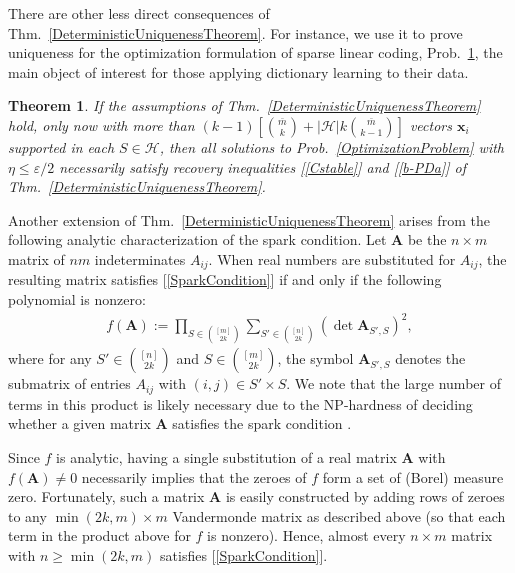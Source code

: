 \documentclass[9pt,twocolumn]{pnas-new}
\newtheorem{theorem}{Theorem}
\renewcommand{\eqref}[1]{\textnormal{[\ref{#1}]}}
\begin{document}
There are other less direct consequences of Thm.~\ref{DeterministicUniquenessTheorem}.  For instance, we use it to prove uniqueness for the optimization formulation of sparse linear coding, Prob.~\ref{SLCopt}, the main object of interest for those applying dictionary learning to their data.

\begin{theorem}\label{SLCopt}
If the assumptions of Thm.~\ref{DeterministicUniquenessTheorem} hold, only now with more than $(k-1)\left[ {\bar m \choose k} + |\mathcal{H}|k{\bar m \choose k-1}\right]$ vectors $\mathbf{x}_i$ supported in each $S \in \mathcal{H}$, then all solutions to Prob.~\ref{OptimizationProblem} with $\eta \leq \varepsilon / 2$ necessarily satisfy recovery inequalities \eqref{Cstable} and \eqref{b-PDa} of Thm.~\ref{DeterministicUniquenessTheorem}.
\end{theorem}

Another extension of Thm.~\ref{DeterministicUniquenessTheorem} arises from the following analytic characterization of the spark condition.  Let $\mathbf{A}$  be the $n \times m$ matrix of $nm$ indeterminates $A_{ij}$. When real numbers are substituted for $A_{ij}$, the resulting matrix satisfies \eqref{SparkCondition} if and only if the following polynomial is nonzero:
\begin{align*}
f(\mathbf{A}) := \prod_{S \in {[m] \choose 2k}} \sum_{S' \in {[n] \choose 2k}} (\det \mathbf{A}_{S',S})^2,
\end{align*}
%
where for any $S' \in {[n] \choose 2k}$ and $S \in {[m] \choose 2k}$, the symbol $\mathbf{A}_{S',S}$ denotes the submatrix of entries $A_{ij}$ with $(i,j) \in S' \times S$.   We note that the large number of terms in this product is likely necessary due to the NP-hardness of deciding whether a given matrix $\mathbf{A}$ satisfies the spark condition \cite{tillmann2014computational}.

Since $f$ is analytic, having a single substitution of a real matrix $\mathbf{A}$ with $f(\mathbf{A}) \neq 0$ necessarily implies that the zeroes of $f$ form a set of (Borel) measure zero. Fortunately, such a matrix $\mathbf{A}$ is easily constructed by adding rows of zeroes to any $\min(2k,m) \times m$ Vandermonde matrix as described above (so that each term in the product above for $f$ is nonzero). Hence, almost every $n \times m$ matrix with $n \geq \min(2k,m)$ satisfies \eqref{SparkCondition}.
\end{document}
